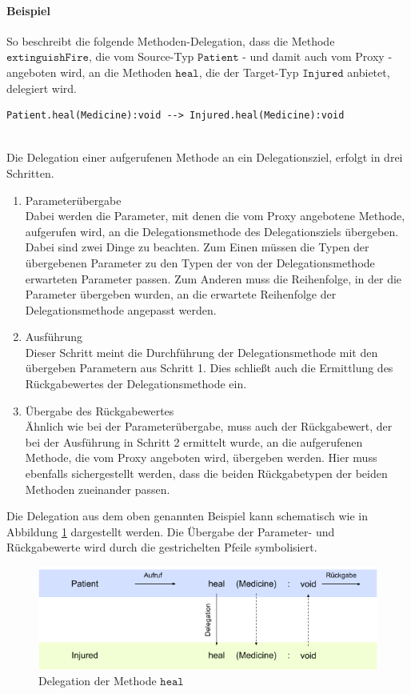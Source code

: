 \documentclass[a4paper,12pt]{article}
\begin{document}
\paragraph{Beispiel} So beschreibt die folgende Methoden-Delegation, dass die Methode $\texttt{extinguishFire}$, die vom Source-Typ $\texttt{Patient}$ - und damit auch vom Proxy - angeboten wird, an die Methoden $\texttt{heal}$, die der Target-Typ $\texttt{Injured}$ anbietet, delegiert wird.
\begin{lstlisting}[style = dsl]
	Patient.heal(Medicine):void --> Injured.heal(Medicine):void
\end{lstlisting}
\noindent\\
Die Delegation einer aufgerufenen Methode an ein Delegationsziel, erfolgt in drei Schritten.
\begin{enumerate}
\item Parameterübergabe\\
Dabei werden die Parameter, mit denen die vom Proxy angebotene Methode, aufgerufen wird, an die Delegationsmethode des Delegationsziels übergeben. Dabei sind zwei Dinge zu beachten. Zum Einen müssen die Typen der übergebenen Parameter zu den Typen der von der Delegationsmethode erwarteten Parameter passen. Zum Anderen muss die Reihenfolge, in der die Parameter übergeben wurden, an die erwartete Reihenfolge der Delegationsmethode angepasst werden.
\item Ausführung\\
Dieser Schritt meint die Durchführung der Delegationsmethode mit den übergeben Parametern aus Schritt 1. Dies schließt auch die Ermittlung des Rückgabewertes der Delegationsmethode ein.
\item Übergabe des Rückgabewertes\\
Ähnlich wie bei der Parameterübergabe, muss auch der Rückgabewert, der bei der Ausführung in Schritt 2 ermittelt wurde, an die aufgerufenen Methode, die vom Proxy angeboten wird, übergeben werden. Hier muss ebenfalls sichergestellt werden, dass die beiden Rückgabetypen der beiden Methoden zueinander passen.
\end{enumerate}
Die Delegation aus dem oben genannten Beispiel kann schematisch wie in Abbildung \ref{fig:DEL_heal} dargestellt werden. Die Übergabe der Parameter- und Rückgabewerte wird durch die gestrichelten Pfeile symbolisiert.
\begin{figure}[H]
\includegraphics[width=\linewidth]{MDEL_heal}
\caption{Delegation der Methode $\texttt{heal}$}
\label{fig:DEL_heal}
\end{figure}
\end{document}
